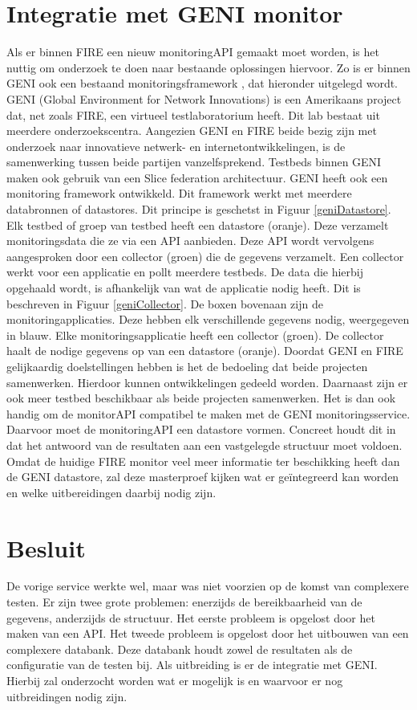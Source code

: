 \section{Integratie met GENI monitor}
\npar
Als er binnen FIRE een nieuw monitoringAPI gemaakt moet worden, is het nuttig om onderzoek te doen naar bestaande oplossingen hiervoor. Zo is er binnen GENI ook een bestaand monitoringsframework \citep{geni-monitor}, dat hieronder uitgelegd wordt.
\npar
GENI (Global Environment for Network Innovations) is een Amerikaans project dat, net zoals FIRE, een virtueel testlaboratorium heeft. Dit lab bestaat uit meerdere onderzoekscentra. Aangezien GENI en FIRE beide bezig zijn met onderzoek naar innovatieve netwerk- en internetontwikkelingen, is de samenwerking tussen beide partijen vanzelfsprekend.
\clearpage
\npar
Testbeds binnen GENI maken ook gebruik van een Slice federation architectuur. GENI heeft ook een monitoring framework ontwikkeld. Dit framework werkt met meerdere databronnen of datastores. Dit principe is geschetst in Figuur \ref{geniDatastore}. Elk testbed of groep van testbed heeft een datastore (oranje). Deze verzamelt monitoringsdata die ze via een API aanbieden. Deze API wordt vervolgens aangesproken door een collector (groen) die de gegevens verzamelt.
\npar
Een collector werkt voor een applicatie en pollt meerdere testbeds. De data die hierbij opgehaald wordt, is afhankelijk van wat de applicatie nodig heeft. Dit is beschreven in Figuur \ref{geniCollector}. De boxen bovenaan zijn de monitoringapplicaties. Deze hebben elk verschillende gegevens nodig, weergegeven in blauw. Elke monitoringsapplicatie heeft een collector (groen). De collector haalt de nodige gegevens op van een datastore (oranje).
\npar
Doordat GENI en FIRE gelijkaardig doelstellingen hebben is het de bedoeling dat beide projecten samenwerken. Hierdoor kunnen ontwikkelingen gedeeld worden. Daarnaast zijn er ook meer testbed beschikbaar als beide projecten samenwerken. Het is dan ook handig om de monitorAPI compatibel te maken met de GENI monitoringsservice. Daarvoor moet de monitoringAPI een datastore vormen. Concreet houdt dit in dat het antwoord van de resultaten aan een vastgelegde structuur moet voldoen. Omdat de huidige FIRE monitor veel meer informatie ter beschikking heeft dan de GENI datastore, zal deze masterproef kijken wat er ge\"integreerd kan worden en welke uitbereidingen daarbij nodig zijn.
\section{Besluit}
De vorige service werkte wel, maar was niet voorzien op de komst van complexere testen. Er zijn twee grote problemen: enerzijds de bereikbaarheid van de gegevens, anderzijds de structuur. Het eerste probleem is opgelost door het maken van een API. Het tweede probleem is opgelost door het uitbouwen van een complexere databank. Deze databank houdt zowel de resultaten als de configuratie van de testen bij. Als uitbreiding is er de integratie met GENI. Hierbij zal onderzocht worden wat er mogelijk is en waarvoor er nog uitbreidingen nodig zijn.